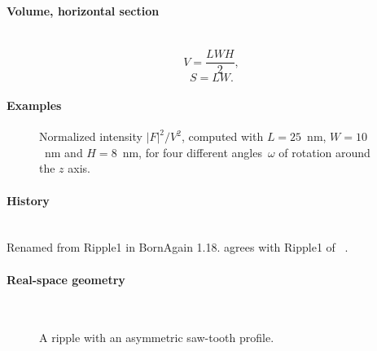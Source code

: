\paragraph{Volume, horizontal section}\strut\\
\begin{equation*}
  V = \dfrac{L W H}{2},
\end{equation*}
\begin{equation*}
  S = L W.
\end{equation*}

\paragraph{Examples}\strut

\begin{figure}[H]
\begin{center}
\end{center}
\caption{Normalized intensity $|F|^2/V^2$,
computed with $L=25$~nm, $W=10$~nm and $H=8$~nm,
for four different angles~$\omega$ of rotation around the $z$ axis.}
\end{figure}

\paragraph{History}\strut\\
Renamed from Ripple1 in BornAgain 1.18.
 agrees with Ripple1 of \FitGISAXS\ \cite{Bab13}.

 \label{SSawtoothRipple}

\paragraph{Real-space geometry}\strut\\

\begin{figure}[H]
\hfill
{}
\hfill
{}
\hfill
{}
\hfill
\caption{A ripple with an asymmetric saw-tooth profile.}
\end{figure}

